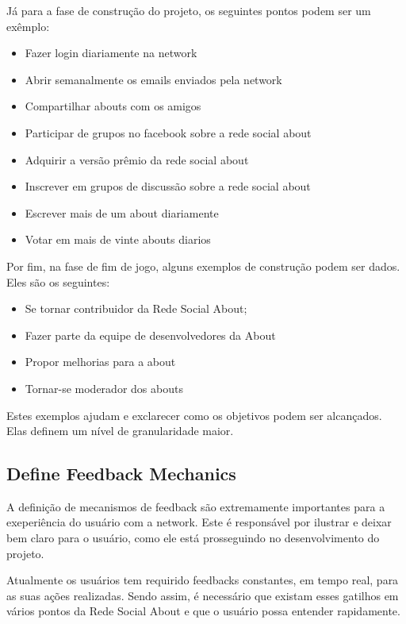 Já para a fase de construção do projeto, os seguintes pontos podem ser um
exêmplo:

\begin{itemize}
    \item Fazer login diariamente na network
    \item Abrir semanalmente os emails enviados pela network
    \item Compartilhar abouts com os amigos
    \item Participar de grupos no facebook sobre a rede social about
    \item Adquirir a versão prêmio da rede social about
    \item Inscrever em grupos de discussão sobre a rede social about
    \item Escrever mais de um about diariamente
    \item Votar em mais de vinte abouts diarios
\end{itemize}

Por fim, na fase de fim de jogo, alguns exemplos de construção podem ser dados. Eles são os seguintes:
\begin{itemize}
    \item Se tornar contribuidor da Rede Social About;
    \item Fazer parte da equipe de desenvolvedores da About
    \item Propor melhorias para a about
    \item Tornar-se moderador dos abouts
\end{itemize}

Estes exemplos ajudam e exclarecer como os objetivos podem ser alcançados. Elas definem um nível de
granularidade maior.

\subsection{Define Feedback Mechanics}
\label{sub:define_feedback_mechanics}
A definição de mecanismos de feedback são extremamente importantes para a exeperiência do usuário
com a network. Este é responsável por ilustrar e deixar bem claro para o usuário, como ele está
prosseguindo no desenvolvimento do projeto.

Atualmente os usuários tem requirido feedbacks constantes, em tempo real, para as suas ações
realizadas. Sendo assim, é necessário que existam esses gatilhos em vários pontos da
Rede Social About e que o usuário possa entender rapidamente.

